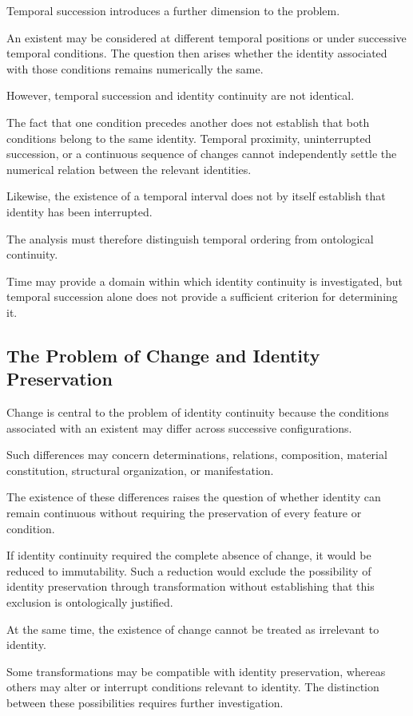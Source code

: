 Temporal succession introduces a further dimension
to the problem.

An existent may be considered at different temporal
positions or under successive temporal conditions.
The question then arises whether the identity
associated with those conditions remains numerically
the same.

However, temporal succession and identity continuity
are not identical.

The fact that one condition precedes another does
not establish that both conditions belong to the
same identity. Temporal proximity, uninterrupted
succession, or a continuous sequence of changes
cannot independently settle the numerical relation
between the relevant identities.

Likewise, the existence of a temporal interval
does not by itself establish that identity has
been interrupted.

The analysis must therefore distinguish temporal
ordering from ontological continuity.

Time may provide a domain within which identity
continuity is investigated, but temporal succession
alone does not provide a sufficient criterion
for determining it.

\subsection{The Problem of Change and Identity Preservation}

Change is central to the problem of identity continuity
because the conditions associated with an existent
may differ across successive configurations.

Such differences may concern determinations,
relations, composition, material constitution,
structural organization, or manifestation.

The existence of these differences raises the
question of whether identity can remain continuous
without requiring the preservation of every feature
or condition.

If identity continuity required the complete absence
of change, it would be reduced to immutability.
Such a reduction would exclude the possibility
of identity preservation through transformation
without establishing that this exclusion is
ontologically justified.

At the same time, the existence of change cannot
be treated as irrelevant to identity.

Some transformations may be compatible with
identity preservation, whereas others may alter
or interrupt conditions relevant to identity.
The distinction between these possibilities
requires further investigation.

